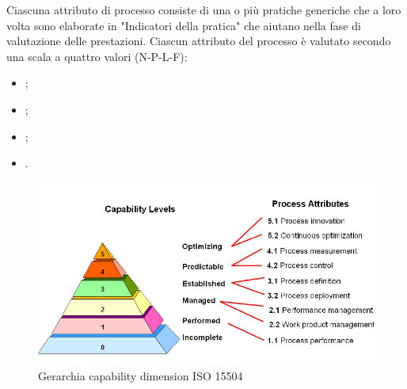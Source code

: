 Ciascuna attributo di processo consiste di una o più pratiche generiche che a loro volta sono elaborate in "Indicatori della pratica" che aiutano nella fase di valutazione delle prestazioni.
Ciascun attributo del processo è valutato secondo una scala a quattro valori (N-P-L-F):
\begin{itemize}
	\item {};
	\item {};
	\item {};
	\item {}.
\end{itemize}
\begin{figure}[h]
	\includegraphics[width=1\textwidth]{../includes/pics/ISO_15504.png}
	\caption{Gerarchia capability dimension ISO 15504}
\end{figure}
